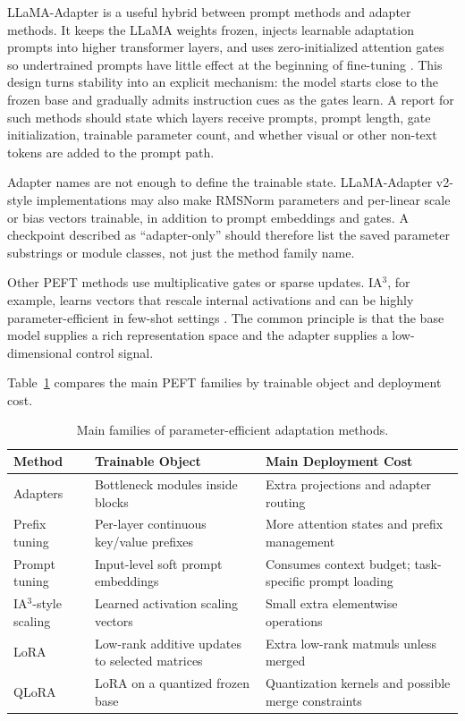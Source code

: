 LLaMA-Adapter is a useful hybrid between prompt methods and adapter methods. It keeps the LLaMA weights frozen, injects learnable adaptation prompts into higher transformer layers, and uses zero-initialized attention gates so undertrained prompts have little effect at the beginning of fine-tuning \cite{zhang2023llamaadapter}. This design turns stability into an explicit mechanism: the model starts close to the frozen base and gradually admits instruction cues as the gates learn. A report for such methods should state which layers receive prompts, prompt length, gate initialization, trainable parameter count, and whether visual or other non-text tokens are added to the prompt path.

Adapter names are not enough to define the trainable state. LLaMA-Adapter v2-style implementations may also make RMSNorm parameters and per-linear scale or bias vectors trainable, in addition to prompt embeddings and gates. A checkpoint described as ``adapter-only'' should therefore list the saved parameter substrings or module classes, not just the method family name.

Other PEFT methods use multiplicative gates or sparse updates. IA$^3$, for example, learns vectors that rescale internal activations and can be highly parameter-efficient in few-shot settings \cite{liu2022fewshot}. The common principle is that the base model supplies a rich representation space and the adapter supplies a low-dimensional control signal.

Table~\ref{tab:peft-families} compares the main PEFT families by trainable object and deployment cost.

\begin{table}[t]
\caption{Main families of parameter-efficient adaptation methods.}
\label{tab:peft-families}
\small
\begin{tabular}{@{}p{2.4cm}p{3.7cm}p{4.9cm}@{}}
\toprule
Method & Trainable Object & Main Deployment Cost \\
\midrule
Adapters & Bottleneck modules inside blocks & Extra projections and adapter routing \\
Prefix tuning & Per-layer continuous key/value prefixes & More attention states and prefix management \\
Prompt tuning & Input-level soft prompt embeddings & Consumes context budget; task-specific prompt loading \\
IA$^3$-style scaling & Learned activation scaling vectors & Small extra elementwise operations \\
LoRA & Low-rank additive updates to selected matrices & Extra low-rank matmuls unless merged \\
QLoRA & LoRA on a quantized frozen base & Quantization kernels and possible merge constraints \\
\bottomrule
\end{tabular}
\end{table}

